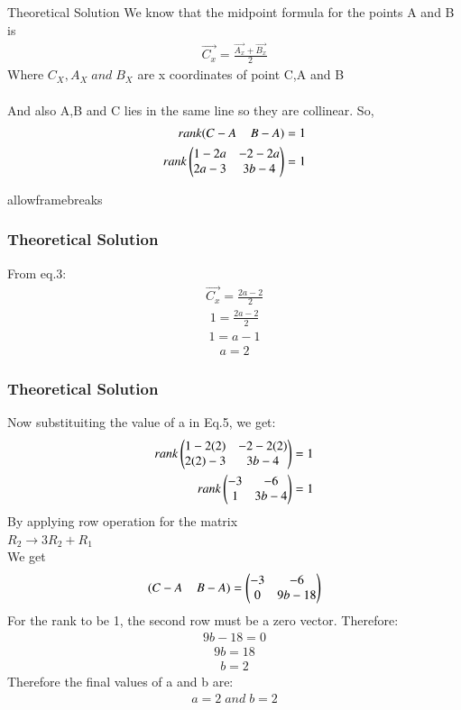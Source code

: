 \documentclass{beamer}
\begin{document}
\begin{frame}{Theoretical Solution}
We know that the midpoint formula for the points A and B is
\begin{align}
    \vec{C_x}=\frac{\vec{A_x}+\vec{B_x}}{2}
\end{align}
Where $C_X,A_X\;and\;B_X$ are x coordinates of point C,A and B \\\\
And also A,B and C lies in the same line so they are collinear. So,
\begin{align}
   rank(C-A\;\;\;\;B-A )=1\\
   rank\myvec{1-2a&-2-2a\\
   2a-3&3b-4}=1
\end{align}
\end{frame}
\begin{frame}{allowframebreaks}
\frametitle{Theoretical Solution}
  From eq.3:
\begin{align}
    \vec{C_x}=\frac{2a-2}{2}
\end{align}
\begin{align}
    1=\frac{2a-2}{2}
\end{align}
\begin{align}
    1=a-1
\end{align}
\begin{align}
    a=2
\end{align}

\end{frame}
\begin{frame}
\frametitle{Theoretical Solution}
Now substituiting the value of a in Eq.5, we get:
\begin{align}
     rank\myvec{1-2(2)&-2-2(2)\\
   2(2)-3&3b-4}=1\\
    rank\myvec{-3&-6\\
   1&3b-4}=1
\end{align}
By applying row operation for the matrix\\
$R_2\longrightarrow3R_2+R_1$\\
We get
\begin{align}
   (C-A\;\;\;\;B-A)=\myvec{-3&-6\\
   0&9b-18}
\end{align}
For the rank to be 1, the second row must be a zero vector. Therefore:
\begin{align}
9b-18=0
\end{align}
\begin{align}
9b=18
\end{align}
\begin{align}
b=2
\end{align}
Therefore the final values of a and b are:
\begin{align}
    a=2\;and\;b=2
\end{align}
\end{frame}
\end{document}
